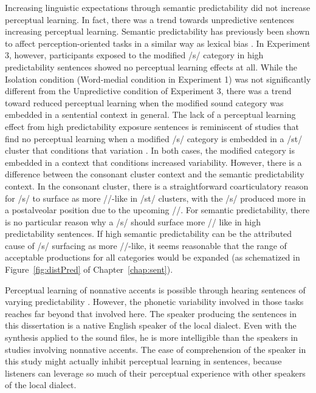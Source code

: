 Increasing linguistic expectations through semantic predictability did not increase perceptual learning.
In fact, there was a trend towards unpredictive sentences increasing perceptual learning.
Semantic predictability has previously been shown to affect perception-oriented tasks in a similar way as lexical bias \citep{Connine1987, Borsky1998}.
In Experiment 3, however, participants exposed to the modified /s/ category in high predictability sentences showed no perceptual learning effects at all.
While the Isolation condition (Word-medial condition in Experiment 1) was not significantly different from the Unpredictive condition of Experiment 3, there was a trend toward reduced perceptual learning when the modified sound category was embedded in a sentential context in general.
The lack of a perceptual learning effect from high predictability exposure sentences is reminiscent of studies that find no perceptual learning when a modified /s/ category is embedded in a /st\textturnr/ cluster that conditions that variation \citep{Kraljic2008a}.
In both cases, the modified category is embedded in a context that conditions increased variability.
However, there is a difference between the consonant cluster context and the semantic predictability context.
In the consonant cluster, there is a straightforward coarticulatory reason for /s/ to surface as more /\textesh/-like in /st\textturnr/ clusters, with the /s/ produced more in a postalveolar position due to the upcoming /\textturnr/.
For semantic predictability, there is no particular reason why a /s/ should surface more /\textesh/ like in high predictability sentences.
If high semantic predictability can be the attributed cause of /s/ surfacing as more /\textesh/-like, it seems reasonable that the range of acceptable productions for all categories would be expanded (as schematized in Figure~\ref{fig:distPred} of Chapter~\ref{chap:sent}).

Perceptual learning of nonnative accents is possible through hearing sentences of varying predictability \citep[and others]{Bradlow2008}.
However, the phonetic variability involved in those tasks reaches far beyond that involved here.  
The speaker producing the sentences in this dissertation is a native English speaker of the local dialect.
Even with the synthesis applied to the sound files, he is more intelligible than the speakers in studies involving nonnative accents.
The ease of comprehension of the speaker in this study might actually inhibit perceptual learning in sentences, because listeners can leverage so much of their perceptual experience with other speakers of the local dialect.

